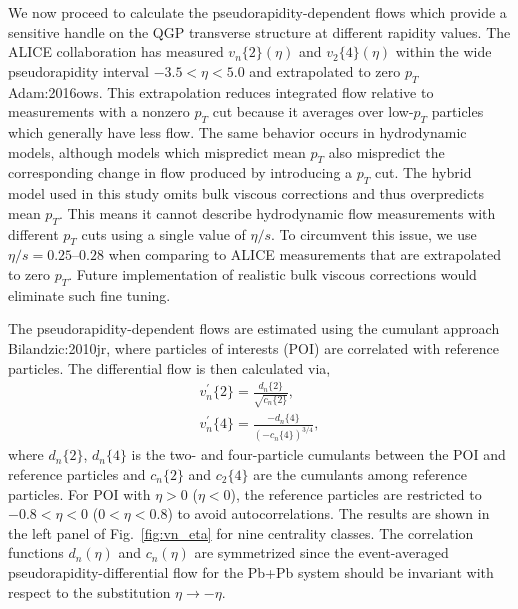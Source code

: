 We now proceed to calculate the pseudorapidity-dependent flows which provide a sensitive handle on the QGP transverse structure at different rapidity values.
The ALICE collaboration has measured $v_n\{2\}(\eta)$ and $v_2\{4\}(\eta)$ within the wide pseudorapidity interval $-3.5 < \eta < 5.0$ and extrapolated to zero $p_T$ {Adam:2016ows}. 
This extrapolation reduces integrated flow relative to measurements with a nonzero $p_T$ cut because it averages over low-$p_T$ particles which generally have less flow.
The same behavior occurs in hydrodynamic models, although models which mispredict mean $p_T$ also mispredict the corresponding change in flow produced by introducing a $p_T$ cut.
The hybrid model used in this study omits bulk viscous corrections and thus overpredicts mean $p_T$.
This means it cannot describe hydrodynamic flow measurements with different $p_T$ cuts using a single value of $\eta/s$.
To circumvent this issue, we use $\eta/s=0.25$--$0.28$ when comparing to ALICE measurements that are extrapolated to zero $p_T$. 
Future implementation of realistic bulk viscous corrections would eliminate such fine tuning.

The pseudorapidity-dependent flows are estimated using the cumulant approach {Bilandzic:2010jr}, where particles of interests (POI) are correlated with reference particles.
The differential flow is then calculated via,
\begin{eqnarray}
v_n^\prime\{2\} = \frac{d_n\{2\}}{\sqrt{c_n\{2\}}},\\
v_n^\prime\{4\} = \frac{-d_n\{4\}}{\left(-c_n\{4\}\right)^{3/4}},
\end{eqnarray}
where $d_n\{2\}$, $d_n\{4\}$ is the two- and four-particle cumulants between the POI and reference particles and $c_n\{2\}$ and $c_2\{4\}$ are the cumulants among reference particles.
For POI with $\eta > 0$ ($\eta < 0$), the reference particles are restricted to $-0.8 <\eta < 0$ ($0 <\eta < 0.8$) to avoid autocorrelations.
The results are shown in the left panel of Fig.~\ref{fig:vn_eta} for nine centrality classes.
The correlation functions $d_n(\eta)$ and $c_n(\eta)$ are symmetrized since the event-averaged pseudorapidity-differential flow for the Pb+Pb system should be invariant with respect to the substitution $\eta \rightarrow -\eta$.

